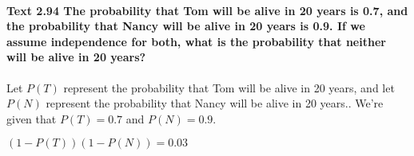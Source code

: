 \documentclass{article}
\begin{document}
\paragraph{Text 2.94 The probability that Tom will be alive in 20 years is 0.7, 
and the probability that Nancy will be alive in 20 years is 0.9. If we assume 
independence for both, what is the probability that neither will be alive in 20 
years?\\}
Let $P(T)$ represent the probability that Tom will be alive in 20 years, and 
let $P(N)$ represent the probability that Nancy will be alive in 20 years.. 
We're given that $P(T) = 0.7$ and $P(N) = 0.9$.\\
\begin{center}
$\boxed{(1 - P(T))(1 - P(N)) = 0.03}$
\end{center}
\end{document}
